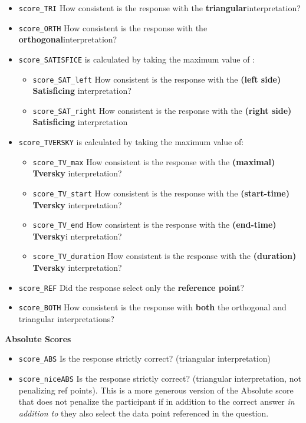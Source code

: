 \documentclass[
  letterpaper,
  DIV=11,
  numbers=noendperiod]{scrreprt}
\providecommand{\tightlist}{%
  \setlength{\itemsep}{0pt}\setlength{\parskip}{0pt}}\usepackage{longtable,booktabs,array}
\begin{document}
\begin{itemize}
\tightlist
\item
  \texttt{score\_TRI} How consistent is the response with the
  \textbf{triangular}interpretation?
\item
  \texttt{score\_ORTH} How consistent is the response with the
  \textbf{orthogonal}interpretation?
\item
  \texttt{score\_SATISFICE} is calculated by taking the maximum value of
  :

  \begin{itemize}
  \item
    \texttt{score\_SAT\_left} How consistent is the response with the
    \textbf{(left side) Satisficing} interpretation?
  \item
    \texttt{score\_SAT\_right} How consistent is the response with the
    \textbf{(right side) Satisficing} interpretation
  \end{itemize}
\item
  \texttt{score\_TVERSKY} is calculated by taking the maximum value of:

  \begin{itemize}
  \item
    \texttt{score\_TV\_max} How consistent is the response with the
    \textbf{(maximal) Tversky} interpretation?
  \item
    \texttt{score\_TV\_start} How consistent is the response with the
    \textbf{(start-time) Tversky} interpretation?
  \item
    \texttt{score\_TV\_end} How consistent is the response with the
    \textbf{(end-time) Tversky}i nterpretation?
  \item
    \texttt{score\_TV\_duration} How consistent is the response with the
    \textbf{(duration) Tversky} interpretation?
  \end{itemize}
\item
  \texttt{score\_REF} Did the response select only the \textbf{reference
  point}?
\item
  \texttt{score\_BOTH} How consistent is the response with \textbf{both}
  the orthogonal and triangular interpretations?
\end{itemize}

\textbf{Absolute Scores}

\begin{itemize}
\tightlist
\item
  \texttt{score\_ABS} Is the response strictly correct? (triangular
  interpretation)
\item
  \texttt{score\_niceABS} Is the response strictly correct? (triangular
  interpretation, not penalizing ref points). This is a more generous
  version of the Absolute score that does not penalize the participant
  if in addition to the correct answer \emph{in addition to} they also
  select the data point referenced in the question.
\end{itemize}
\end{document}
